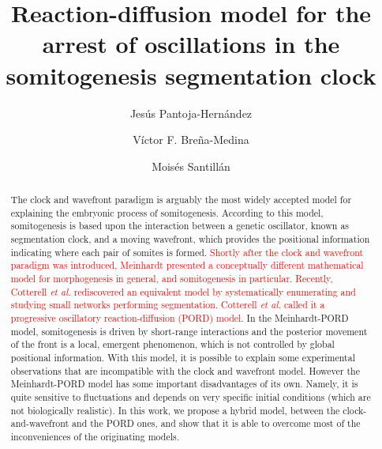 \documentclass[%
 preprint,
 aip, 
 amsmath,amssymb,
]{revtex4-2}
\begin{document}
\title{Reaction-diffusion model for the arrest of oscillations in the somitogenesis segmentation clock}

\author{Jes\'us Pantoja-Hern\'andez}

\author{V\'ictor F. Bre\~na-Medina}

\author{Mois\'es Santill\'an}

\begin{abstract}
The clock and wavefront paradigm is arguably the most widely accepted model for explaining the embryonic process of somitogenesis. According to this model, somitogenesis is based upon the interaction between a genetic oscillator, known as segmentation clock, and a moving wavefront, which provides the positional information indicating where each pair of somites is formed. \textcolor{red}{Shortly after the clock and wavefront paradigm was introduced, Meinhardt presented a conceptually different mathematical model for morphogenesis in general, and somitogenesis in particular. Recently, Cotterell \emph{et al.} rediscovered an equivalent model by systematically enumerating and studying small networks performing segmentation. Cotterell \emph{et al.} called it a progressive oscillatory reaction-diffusion (PORD) model}. In the Meinhardt-PORD model, somitogenesis is driven by short-range interactions and the posterior movement of the front is a local, emergent phenomenon, which is not controlled by global positional information. With this model, it is possible to explain some experimental observations that are incompatible with the clock and wavefront model. However the Meinhardt-PORD model has some important disadvantages of its own. Namely, it is quite sensitive to fluctuations and depends on very specific initial conditions (which are not biologically realistic). In this work, we propose a hybrid model, between the clock-and-wavefront and the PORD ones, and show that it is able to overcome most of the inconveniences of the originating models.
\end{abstract}
	
\maketitle
\end{document}
